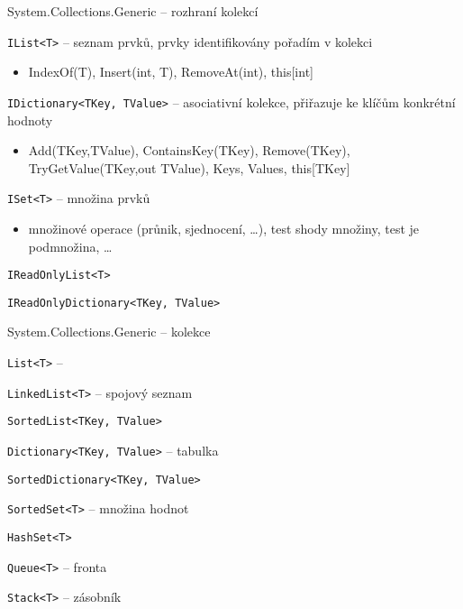 \begin{frame}[fragile]
\begin{bitemize}{System.Collections.Generic -- rozhraní kolekcí}
\item \lstinline|IList<T>| -- seznam prvků, prvky identifikovány pořadím v kolekci
\begin{itemize}
\item \footnotesize IndexOf(T), Insert(int, T), RemoveAt(int), this[int]
\end{itemize}

\item \lstinline|IDictionary<TKey, TValue>| -- asociativní kolekce, přiřazuje ke klíčům konkrétní hodnoty
\begin{itemize}
\item \footnotesize Add(TKey,TValue), ContainsKey(TKey), Remove(TKey), TryGetValue(TKey,out TValue), Keys, Values, this[TKey]
\end{itemize}

\item \lstinline|ISet<T>| -- množina prvků
\begin{itemize}
\item \footnotesize množinové operace (průnik, sjednocení, \ldots), test shody množiny, test je podmnožina, \ldots
\end{itemize}

\item \lstinline|IReadOnlyList<T>|
\item \lstinline|IReadOnlyDictionary<TKey, TValue>|
\end{bitemize}
\end{frame}




\begin{frame}[fragile]
\begin{bitemize}{System.Collections.Generic -- kolekce}
\item \lstinline|List<T>| -- 
\item \lstinline|LinkedList<T>| -- spojový seznam
\item \lstinline|SortedList<TKey, TValue>|
\item []
\item \lstinline|Dictionary<TKey, TValue>| -- tabulka 
\item \lstinline|SortedDictionary<TKey, TValue>|
\item \lstinline|SortedSet<T>| -- množina hodnot
\item \lstinline|HashSet<T>|
\item []
\item \lstinline|Queue<T>| -- fronta 
\item \lstinline|Stack<T>| -- zásobník
\end{bitemize}
\end{frame}




